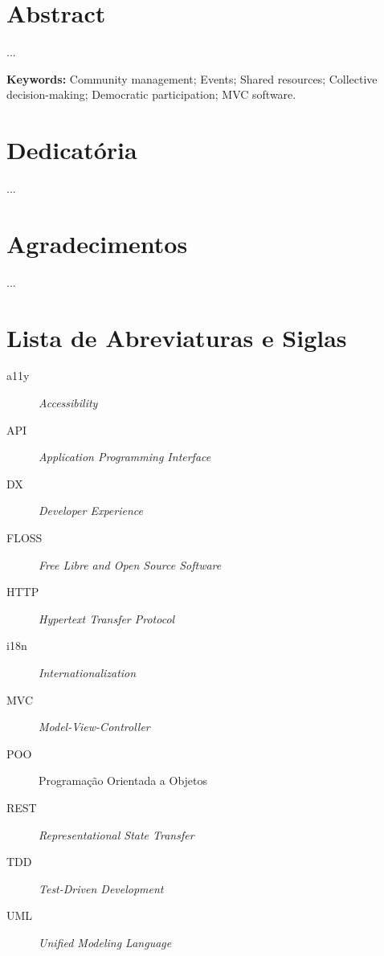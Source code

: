 \documentclass[12pt,a4paper,openright,oneside]{memoir}
\begin{document}
\chapter*{Abstract}
\noindent
...

\bigskip

\textbf{Keywords:} Community management; Events; Shared resources; Collective
decision-making; Democratic participation; MVC software.

\chapter*{Dedicatória}
\begin{flushright}
    ...
\end{flushright}

\chapter*{Agradecimentos}
...

\clearpage
\tableofcontents
\clearpage
\listoffigures
\clearpage
\listoftables
\clearpage

\chapter*{Lista de Abreviaturas e Siglas}
\begin{description}
    \item[a11y] \textit{Accessibility}
    \item[API] \textit{Application Programming Interface}
    \item[DX] \textit{Developer Experience}
    \item[FLOSS] \textit{Free Libre and Open Source Software}
    \item[HTTP] \textit{Hypertext Transfer Protocol}
    \item[i18n] \textit{Internationalization}
    \item[MVC] \textit{Model-View-Controller}
    \item[POO] Programação Orientada a Objetos
    \item[REST] \textit{Representational State Transfer}
    \item[TDD] \textit{Test-Driven Development}
    \item[UML] \textit{Unified Modeling Language}
\end{description}
\end{document}
